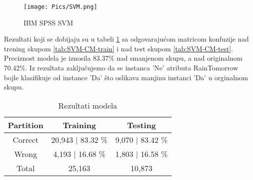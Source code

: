 \documentclass[a4paper]{article}
\begin{document}
\begin{figure}[H]
     \centering
     \texttt{[image: Pics/SVM.png]}
     \caption{IBM SPSS SVM}
     \label{fig:svm-spss}
\end{figure}
Rezultati koji se dobijaju su u tabeli \ref{tab:SVM-res} sa odgovarajućom matricom konfuzije nad trening skupom \ref{tab:SVM-CM-train} i nad test skupom \ref{tab:SVM-CM-test}. Preciznost modela je iznosila 83.37\% nad smanjenom skupu, a nad originalnom 70.42\%. Iz rezultata zaključujemo da se instanca 'Ne' atributa RainTomorrow bojle klasifikuje od instance 'Da' što oslikava manjinu instanci 'Da' u orginalnom skupu.


\begin{table}[H]
        \begin{center}
        \caption{Rezultati modela}
        \label{tab:SVM-res}
        \begin{tabular}{|c|c|c|} \hline
        \textbf{Partition} & \textbf{Training} & \textbf{Testing}\\ \hline
        Correct & 20,943 | 83.32 \% & 9,070 | 83.42 \% \\ \hline
        Wrong    & 4,193 | 16.68 \% & 1,803 | 16.58 \% \\ \hline
        Total & 25,163  & 10,873 \\ \hline
        \end{tabular}
        \end{center}
\end{table}
\end{document}
